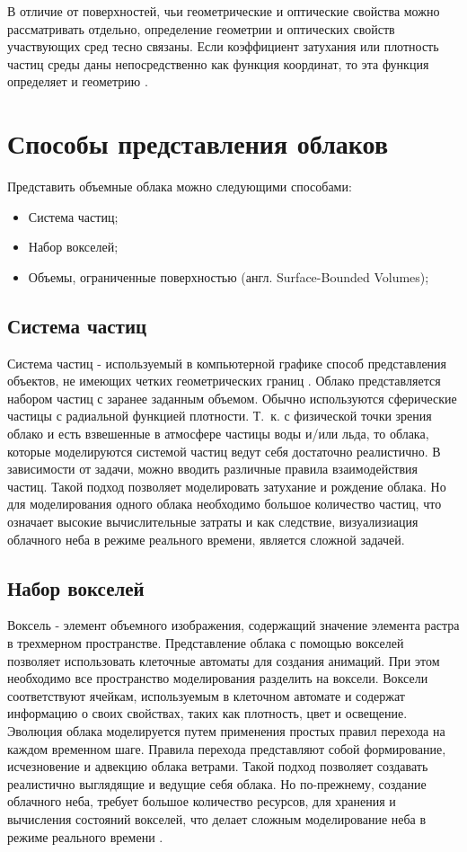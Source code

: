 В отличие от поверхностей, чьи геометрические и оптические свойства можно рассматривать отдельно, определение геометрии и оптических свойств участвующих сред тесно связаны. Если коэффициент затухания или плотность частиц среды даны непосредственно как функция координат, то эта функция определяет и геометрию \cite{partmedia}.  


\section{Способы представления облаков}

Представить объемные облака можно следующими способами:
\begin{itemize}
	\item Система частиц;
	\item Набор вокселей;
	\item Объемы, ограниченные поверхностью (англ. Surface-Bounded Volumes);
\end{itemize}

\subsection{Система частиц}
\label{particles}
Система частиц - используемый в компьютерной графике способ представления объектов, не имеющих четких геометрических границ \cite{particles1}. 
Облако представляется набором частиц с заранее заданным объемом. Обычно используются сферические частицы с радиальной функцией плотности. Т.~к. с физической точки зрения облако и есть взвешенные в атмосфере частицы воды и/или льда, то 
облака, которые моделируются системой частиц ведут себя достаточно реалистично. В зависимости от задачи, можно вводить различные правила взаимодействия частиц.
Такой подход позволяет моделировать затухание и рождение облака. Но для моделирования одного облака необходимо большое количество частиц, что означает высокие вычислительные затраты и как следствие, визуализиация облачного неба в режиме реального времени, является сложной задачей.  

\subsection{Набор вокселей} 

Воксель - элемент объемного изображения, содержащий значение элемента растра в трехмерном пространстве.
Представление облака с помощью вокселей позволяет использовать клеточные автоматы для создания анимаций. При этом необходимо все пространство моделирования разделить на воксели. Воксели
соответствуют ячейкам, используемым в клеточном автомате и содержат информацию о своих свойствах, таких как плотность, цвет и освещение. Эволюция облака моделируется путем
применения простых правил перехода на каждом временном шаге. Правила перехода представляют собой формирование, исчезновение и адвекцию облака ветрами.
Такой подход позволяет создавать реалистично выглядящие и ведущие себя облака. Но по-прежнему, создание облачного неба, требует большое количество ресурсов, для хранения и вычисления состояний вокселей, что делает сложным моделирование неба в режиме реального времени \cite{voxel}.


